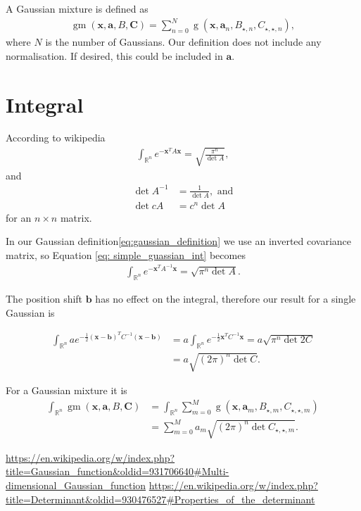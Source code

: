 \documentclass{paper}
\newcommand{\vr}[1]{\ensuremath{\boldsymbol{#1}}}
\newcommand{\tr}[1]{\ensuremath{\boldsymbol{#1}}}
\newcommand{\f}[1]{\operatorname{#1}}
\begin{document}
A Gaussian mixture is defined as
\begin{align}
	\f{gm}(\vr{x}, \vr{a}, B, \tr{C}) = \sum_{n=0}^{N} \f{g}(\vr{x}, \vr{a}_n, B_{\star, n}, C_{\star, \star, n}),
\end{align}
where $N$ is the number of Gaussians.
Our definition does not include any normalisation.
If desired, this could be included in $\vr{a}$.


\section{Integral}
According to wikipedia\cite{wiki_simple_gaussian_int}
\begin{align}
	\label{eq: simple_guassian_int}
	\int_{\mathbb{R}^n} e^{-\vr{x}^TA\vr{x}} = \sqrt{\frac{\pi^n}{\det{A}}},
\end{align}
and\cite{wiki_det_inverse}
\begin{align}
\det{A^{-1}} &= \frac{1}{\det{A}}, \text{ and}\\
\det{cA} &= c^n \det{A}
\end{align}
for an $n \times n$ matrix.

In our Gaussian definition\ref{eq:gaussian_definition} we use an inverted covariance matrix, so Equation \ref{eq: simple_guassian_int} becomes
\begin{align}
	\int_{\mathbb{R}^n} e^{-\vr{x}^TA^{-1}\vr{x}} = \sqrt{\pi^n \det{A}}.
\end{align}

The position shift $\vr{b}$ has no effect on the integral, therefore our result for a single Gaussian is

\begin{align}
	\int_{\mathbb{R}^n} a e^{-\frac{1}{2}(\vr{x}-\vr{b})^TC^{-1}(\vr{x}-\vr{b})} &= a \int_{\mathbb{R}^n} e^{-\frac{1}{2}\vr{x}^TC^{-1}\vr{x}} = a \sqrt{\pi^n \det{2 C}} \\
	&= a \sqrt{(2 \pi)^n \det{C}}.
\end{align}

For a Gaussian mixture it is
\begin{align}
	\int_{\mathbb{R}^n} \f{gm}(\vr{x}, \vr{a}, B, \tr{C}) &= \int_{\mathbb{R}^n} \sum_{m=0}^{M} \f{g}(\vr{x}, \vr{a}_m, B_{\star, m}, C_{\star, \star, m}) \\
	&= \sum_{m=0}^{M} a_m \sqrt{(2 \pi)^n \det{C_{\star, \star, m}}}.
\end{align}


\begin{thebibliography}{9}%
	 \url{https://en.wikipedia.org/w/index.php?title=Gaussian_function&oldid=931706640#Multi-dimensional_Gaussian_function}
	 \url{https://en.wikipedia.org/w/index.php?title=Determinant&oldid=930476527#Properties_of_the_determinant}
\end{thebibliography}
\end{document}

